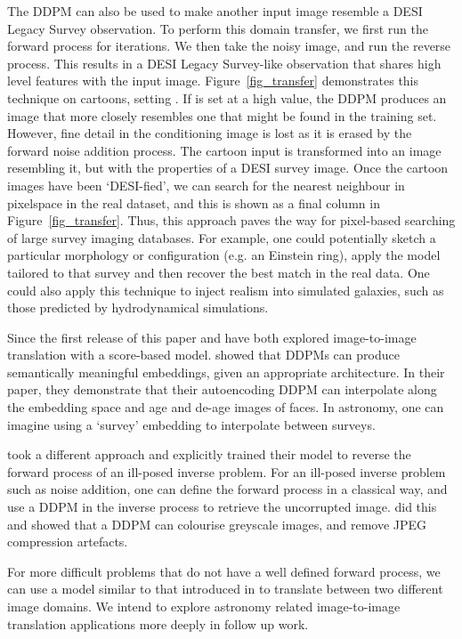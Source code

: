 \documentclass[fleqn,usenatbib]{mnras}
\begin{document}
The DDPM can also be used to make another input image resemble a DESI Legacy
Survey observation. To perform this domain transfer, we first run the forward
process for  iterations. We then take the noisy image, and run the reverse
process.  This results in a DESI Legacy Survey-like observation that shares
high level features with the input image. Figure~\ref{fig_transfer}
demonstrates this technique on cartoons, setting .  If  is set at a
high value, the DDPM produces an image that more closely resembles one that
might be found in the training set. However, fine detail in the conditioning
image is lost as it is erased by the forward noise addition process.  The
cartoon input is transformed into an image resembling it, but with the
properties of a DESI survey image. Once the cartoon images have been
`DESI-fied', we can search for the nearest neighbour in pixelspace in the real
dataset, and this is shown as a final column in Figure~\ref{fig_transfer}.
Thus, this approach paves the way for pixel-based searching of large survey
imaging databases. For example, one could potentially sketch a particular
morphology or configuration (e.g. an Einstein ring), apply the model tailored
to that survey and then recover the best match in the real data. One could also
apply this technique to inject realism into simulated galaxies, such as those
predicted by hydrodynamical simulations. 

Since the first release of this paper \citet{cite_preechakul2021} and
\citet{cite_saharia2021} have both explored image-to-image translation 
with a score-based model. \citet{cite_preechakul2021} showed that DDPMs 
can produce semantically meaningful embeddings, given an appropriate 
architecture. 
In their paper, they demonstrate that their autoencoding DDPM can 
interpolate along the embedding space and age and de-age images of faces. 
In astronomy, one can imagine using a `survey' embedding to interpolate 
between surveys.

\citet{cite_saharia2021} took a different approach and explicitly trained 
their model to reverse the forward process of an ill-posed inverse problem.   
For an ill-posed inverse problem such as noise addition, one can define 
the forward process in a classical way, and use a DDPM in the inverse 
process to retrieve the uncorrupted image.  
\citet{cite_saharia2021} did this and showed that a DDPM
can colourise greyscale images, and remove JPEG compression artefacts.  

For more difficult problems that do not have a well defined forward 
process, we can use a model similar to that introduced in \citet{cite_sasaki2021} 
to translate between two different image domains. We intend to explore astronomy
related image-to-image translation applications more deeply in follow up
work.
\end{document}
